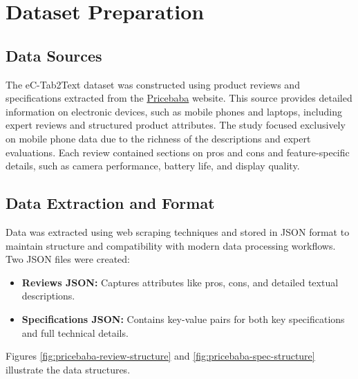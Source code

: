 \section{Dataset Preparation}
\subsection{Data Sources}
The eC-Tab2Text dataset was constructed using product reviews and specifications extracted from the \href{https://pricebaba.com/}{Pricebaba} website. This source provides detailed information on electronic devices, such as mobile phones and laptops, including expert reviews and structured product attributes. The study focused exclusively on mobile phone data due to the richness of the descriptions and expert evaluations. Each review contained sections on pros and cons and feature-specific details, such as camera performance, battery life, and display quality.

\subsection{Data Extraction and Format}
Data was extracted using web scraping techniques and stored in JSON format to maintain structure and compatibility with modern data processing workflows. Two JSON files were created:
\begin{itemize}
    \item \textbf{Reviews JSON:} Captures attributes like pros, cons, and detailed textual descriptions.
    \item \textbf{Specifications JSON:} Contains key-value pairs for both key specifications and full technical details.
\end{itemize}
Figures \ref{fig:pricebaba-review-structure} and \ref{fig:pricebaba-spec-structure} illustrate the data structures.

